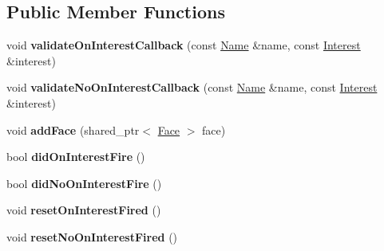 \subsection*{Public Member Functions}
\begin{DoxyCompactItemize}
\item 
void {\bfseries validate\+On\+Interest\+Callback} (const \hyperlink{classndn_1_1Name}{Name} \&name, const \hyperlink{classndn_1_1Interest}{Interest} \&interest)\hypertarget{classnfd_1_1tests_1_1InternalFaceFixture_abfedff7711007f73acf553194b01b5dc}{}\label{classnfd_1_1tests_1_1InternalFaceFixture_abfedff7711007f73acf553194b01b5dc}

\item 
void {\bfseries validate\+No\+On\+Interest\+Callback} (const \hyperlink{classndn_1_1Name}{Name} \&name, const \hyperlink{classndn_1_1Interest}{Interest} \&interest)\hypertarget{classnfd_1_1tests_1_1InternalFaceFixture_a15618da7e7fb936415d4f01230388a4f}{}\label{classnfd_1_1tests_1_1InternalFaceFixture_a15618da7e7fb936415d4f01230388a4f}

\item 
void {\bfseries add\+Face} (shared\+\_\+ptr$<$ \hyperlink{classnfd_1_1Face}{Face} $>$ face)\hypertarget{classnfd_1_1tests_1_1InternalFaceFixture_a32156ea4b0c40997d09331f18452602d}{}\label{classnfd_1_1tests_1_1InternalFaceFixture_a32156ea4b0c40997d09331f18452602d}

\item 
bool {\bfseries did\+On\+Interest\+Fire} ()\hypertarget{classnfd_1_1tests_1_1InternalFaceFixture_a98b6c8619cb070419798f1b7c1004eb6}{}\label{classnfd_1_1tests_1_1InternalFaceFixture_a98b6c8619cb070419798f1b7c1004eb6}

\item 
bool {\bfseries did\+No\+On\+Interest\+Fire} ()\hypertarget{classnfd_1_1tests_1_1InternalFaceFixture_a7f0cec8eedc5a08c46038d113c1b4cbe}{}\label{classnfd_1_1tests_1_1InternalFaceFixture_a7f0cec8eedc5a08c46038d113c1b4cbe}

\item 
void {\bfseries reset\+On\+Interest\+Fired} ()\hypertarget{classnfd_1_1tests_1_1InternalFaceFixture_a5f52d64d8b2c5f1d5243823080d5fef2}{}\label{classnfd_1_1tests_1_1InternalFaceFixture_a5f52d64d8b2c5f1d5243823080d5fef2}

\item 
void {\bfseries reset\+No\+On\+Interest\+Fired} ()\hypertarget{classnfd_1_1tests_1_1InternalFaceFixture_aca737137402e9535b7165006d82eb636}{}\label{classnfd_1_1tests_1_1InternalFaceFixture_aca737137402e9535b7165006d82eb636}

\end{DoxyCompactItemize}
